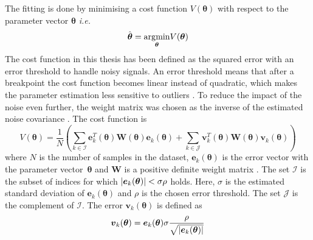 The fitting is done by minimising a cost function $V(\boldsymbol{\theta})$ with respect to the parameter vector $\boldsymbol{\theta}$ \emph{i.e.}
\begin{equation}
\hat{\boldsymbol{\theta}} = \underset{\boldsymbol{\theta}}{\operatorname*{\arg\!\min}} V(\boldsymbol{\theta})
\end{equation}
The cost function in this thesis has been defined as the squared error with an error threshold to handle noisy signals. An error threshold means that after a breakpoint the cost function becomes linear instead of quadratic, which makes the parameter estimation less sensitive to outliers \citep{ljungtheory}. To reduce the impact of the noise even further, the weight matrix was chosen as the inverse of the estimated noise covariance \citep{ljungtheory}. The cost function is
\begin{equation}
    V(\boldsymbol{\theta}) = \frac{1}{N} \left( \sum_{k \in \mathcal{I}} \boldsymbol{e}^T_k(\boldsymbol{\theta}) \boldsymbol{W}(\boldsymbol{\theta})  \boldsymbol{e}_k(\boldsymbol{\theta}) + \sum_{k \in \mathcal{J}} \boldsymbol{v}^T_k(\boldsymbol{\theta}) \boldsymbol{W}(\boldsymbol{\theta})  \boldsymbol{v}_k(\boldsymbol{\theta}) \right)
\end{equation}
where $N$ is the number of samples in the dataset, $\boldsymbol{e}_k(\boldsymbol{\theta})$ is the error vector with the parameter vector~$\boldsymbol{\theta}$ and $\boldsymbol{W}$ is a positive definite weight matrix \citep{ljungtheory}. The set $\mathcal{I}$ is the subset of indices for which $|\boldsymbol{e}_k(\boldsymbol{\theta})| < \sigma \rho$ holds. Here, $\sigma$ is the estimated standard deviation of $\boldsymbol{e}_k(\boldsymbol{\theta})$ and $\rho$ is the chosen error threshold. The set $\mathcal{J}$ is the complement of $\mathcal{I}$. The error $\boldsymbol{v}_k(\boldsymbol{\theta})$ is defined as 
\begin{equation}
\boldsymbol{v}_k(\boldsymbol{\theta}) = \boldsymbol{e}_k(\boldsymbol{\theta}) \sigma\frac{\rho}{\sqrt{|\boldsymbol{e}_k(\boldsymbol{\theta})|}}
\end{equation}

